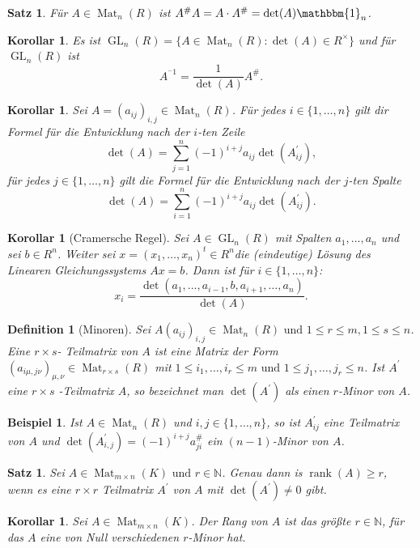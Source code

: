 \documentclass[ngerman,a4paper]{report}
\theoremstyle{changebreak}
\newtheorem{example}[theorem]{Beispiel}
\newtheorem{corollar}[theorem]{Korollar}
\newtheorem{satz}[theorem]{Satz}
\newtheorem{definition}[theorem]{Definition}
\newcommand{\highlight}[1]{\emph{#1}}
\DeclareMathOperator{\Mat}{Mat}
\DeclareMathOperator{\GL}{GL}
\DeclareMathOperator{\rk}{rank}
\begin{document}
\begin{satz}
    Für $A\in \Mat_n(R)$ ist $A^{\#}A = A\cdot A^{\#} = \det(A)\mathbbm{1}_n$.
\end{satz}

\begin{corollar}
    Es ist $\GL_n(R) = \{ A \in \Mat_n(R)\colon \det(A) \in R^{\times} \}$ und für $\GL_n(R)$ ist
    \[
    A^{^-1} = \frac{1}{\det(A)}A^{\#}.
    \]
\end{corollar}

\begin{corollar}
    Sei $A=(a_{ij})_{i,j} \in \Mat_n(R)$. Für jedes $i\in\{1,\dots,n\}$ gilt dir Formel für die \highlight{Entwicklung nach der $i$-ten Zeile}
    \[
    \det(A) = \sum_{j=1}^{n}(-1)^{i+j}a_{ij}\det(A_{ij}^{'}),
    \]
    für jedes $j\in\{1,\dots,n\}$ gilt die Formel für die Entwicklung nach der $j$-ten Spalte
    \[
    \det(A) = \sum_{i=1}^{n}(-1)^{i+j}a_{ij}\det(A_{ij}^{'}).
    \]
\end{corollar}

\begin{corollar}[Cramersche Regel]
    Sei $A\in\GL_n(R)$ mit Spalten $a_1,\dots,a_n$ und sei $b \in R^n$. Weiter sei $x=(x_1,\dots,x_n)^t \in R^n$die (eindeutige) Lösung des Linearen Gleichungssystems $Ax=b$.
    Dann ist für $i\in\{1,\dots,n\}$:
    \[
    x_i = \frac{\det(a_1,\dots,a_{i-1},b,a_{i+1},\dots,a_n)}{\det(A)}.
    \]
\end{corollar}

\begin{definition}[Minoren]
    Sei $A(a_{ij})_{i,j}\in \Mat_n(R) \text{ und } 1 \leq r \leq m,1 \leq s \leq n$. Eine \highlight{$r \times s$- Teilmatrix} von $A$ ist eine Matrix der Form $(a_{i\mu,j\nu})_{\mu,\nu} \in \Mat_{r\times s}(R)$ mit $1\leq i_{1}, \dots, i_{r} \leq m \text{ und } 1\leq j_{1}, \dots, j_{r} \leq n$. Ist $A^{'}$ eine $r\times s$      -Teilmatrix $A$, so bezeichnet man $\det(A^{'})$ als einen \highlight{$r$-Minor} von $A$.
\end{definition}

\begin{example}
    Ist $A\in \Mat_n(R)$ und $i,j \in\{1,\dots,n\}$, so ist $A_{ij}^{'}$ eine Teilmatrix von $A$ und $\det(A_{i,j}^{'})=(-1)^{i+j}a_{ji}^{\#}$ ein $(n-1)$-Minor von $A$.
\end{example}

\begin{satz}
    Sei $A\in \Mat_{m\times n}(K) \text{ und } r \in \mathbb{N}$. Genau dann is $\rk(A) \geq r$, wenn es eine $r\times r$ Teilmatrix $A^{'}$ von $A$ mit $\det(A^{'}) \neq 0$ gibt. 
\end{satz}

\begin{corollar}
    Sei $A\in \Mat_{m\times n}(K)$. Der Rang von $A$ ist das größte $r \in \mathbb{N}$, für das $A$ eine von Null verschiedenen $r$-Minor hat.
\end{corollar}

\printindex
\end{document}

